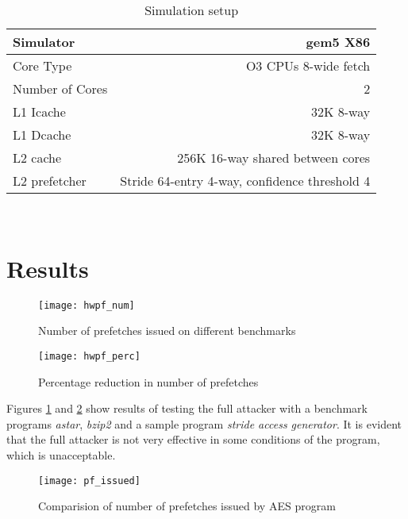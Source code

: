 \begin{table}[hbp]
\centering
\begin{tabular}{|l|r|}
    \hline
    Simulator  & gem5 X86\\
    \hline
    Core Type  & O3 CPUs 8-wide fetch\\
    \hline
    Number of Cores & 2\\
    \hline
    L1 Icache & 32K 8-way\\
    \hline
    L1 Dcache & 32K 8-way\\
    \hline
    L2 cache & 256K 16-way shared between cores\\
    \hline
    L2 prefetcher  & Stride 64-entry 4-way, confidence threshold 4\\
    \hline
\end{tabular}
\\
\caption{Simulation setup}
\label{tab:simulation_setup}
\end{table}

\section{Results} \label{sec:results}

\begin{figure}[htbp]
    \centering
    \texttt{[image: hwpf\_num]}
    \caption{Number of prefetches issued on different benchmarks}
    \label{fig:prefetch_attack}
\end{figure}

\begin{figure}[htbp]
    \centering
    \texttt{[image: hwpf\_perc]}
    \caption{Percentage reduction in number of prefetches}
    \label{fig:prefetch_percred}
\end{figure}

Figures \ref{fig:prefetch_attack} and \ref{fig:prefetch_percred} show
results of testing the full attacker with a benchmark programs \textit{astar},
\textit{bzip2} and a sample program \textit{stride access generator}.
It is evident that the full attacker is not very effective in some
conditions of the program, which is unacceptable.

\begin{figure}[htbp]
    \centering
    \texttt{[image: pf\_issued]}
    \caption{Comparision of number of prefetches issued by AES program}
    \label{fig:targeted_attack}
\end{figure}

